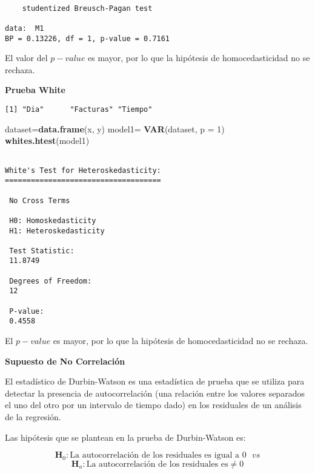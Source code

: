 \documentclass[
  a4paper,
  oneside,
  openany]{book}
\newenvironment{Shaded}{\begin{snugshade}}{\end{snugshade}}
\newcommand{\AttributeTok}[1]{\textcolor[rgb]{0.13,0.29,0.53}{#1}}
\newcommand{\DecValTok}[1]{\textcolor[rgb]{0.00,0.00,0.81}{#1}}
\newcommand{\FunctionTok}[1]{\textcolor[rgb]{0.13,0.29,0.53}{\textbf{#1}}}
\newcommand{\NormalTok}[1]{#1}
\newcommand{\OtherTok}[1]{\textcolor[rgb]{0.56,0.35,0.01}{#1}}
\begin{document}
\begin{verbatim}

    studentized Breusch-Pagan test

data:  M1
BP = 0.13226, df = 1, p-value = 0.7161
\end{verbatim}

El valor del \(p-value\) es mayor, por lo que la hipótesis de homocedasticidad no se rechaza.

\textbf{Prueba White}

\begin{verbatim}
[1] "Dia"      "Facturas" "Tiempo"  
\end{verbatim}

\begin{Shaded}
\begin{Highlighting}[]
\NormalTok{dataset}\OtherTok{=}\FunctionTok{data.frame}\NormalTok{(x, y)}
\NormalTok{model1}\OtherTok{=} \FunctionTok{VAR}\NormalTok{(dataset, }\AttributeTok{p =} \DecValTok{1}\NormalTok{)}
\FunctionTok{whites.htest}\NormalTok{(model1)}
\end{Highlighting}
\end{Shaded}

\begin{verbatim}

White's Test for Heteroskedasticity:
==================================== 

 No Cross Terms

 H0: Homoskedasticity
 H1: Heteroskedasticity

 Test Statistic:
 11.8749 

 Degrees of Freedom:
 12 

 P-value:
 0.4558 
\end{verbatim}

El \(p-value\) es mayor, por lo que la hipótesis de homocedasticidad no se rechaza.

\textbf{Supuesto de No Correlación}

El estadístico de Durbin-Watson es una estadística de prueba que se utiliza para detectar la presencia de autocorrelación (una relación entre los valores separados el uno del otro por un intervalo de tiempo dado) en los residuales de un análisis de la regresión.

Las hipótesis que se plantean en la prueba de Durbin-Watson es:

\[\textbf{H}_0: \mbox{La autocorrelación de los residuales es igual a } 0 \ \ \  vs \]
\[ \textbf{H}_a: \mbox{La autocorrelación de los residuales es} \neq 0\]
\end{document}
